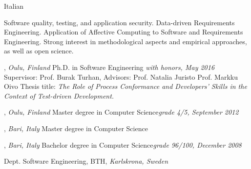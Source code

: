 \documentclass[9pt]{article}
\begin{document}
\bigskip
\bigskip
\bigskip
\flushleft
%

\medskip
\bigskip

{}

\noindent Italian

\medskip

\textheight=580pt

\noindent Software quality, testing, and application security. Data-driven Requirements Engineering. Application of Affective Computing to Software and Requirements Engineering.
Strong interest in methodological aspects and empirical approaches, as well as open science.
\bigskip
\medskip



, \emph{Oulu, Finland} \vspace{0.01in} 
\newline Ph.D. in Software Engineering {\em with honors, May 2016}
\newline Supervisor: Prof. Burak Turhan, Advisors: Prof. Natalia Juristo \amper{} Prof. Markku Oivo
\newline Thesis title: {\em The Role of Process Conformance and Developers' Skills in the Context of Test-driven Development.}

\bigskip


, \emph{Oulu, Finland} \vspace{0.01in}  
\newline\noindent Master degree in Computer Science{\em grade 4/5, September 2012}

\bigskip

, \emph{Bari, Italy} \vspace{0.01in}  
\newline\noindent Master degree in Computer Science


\bigskip

, \emph{Bari, Italy} \vspace{0.01in}  
\newline\noindent Bachelor degree in Computer Science{\em grade 96/100, December 2008}

\bigskip
\medskip
{}
\noindent Dept. Software Engineering, BTH, \emph{Karlskrona, Sweden} \vspace{0.01in} 
\newline{}
\bigskip
\end{document}
